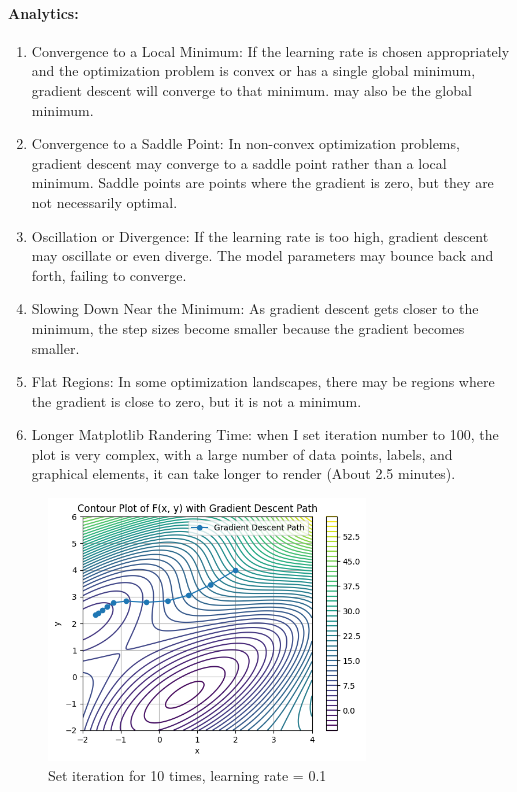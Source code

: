 \paragraph{\textbf{Analytics:}}
\begin{enumerate}
    \item Convergence to a Local Minimum: If the learning rate is chosen appropriately and the optimization problem is convex or has a single global minimum, gradient descent will converge to that minimum. may also be the global minimum.
    \item Convergence to a Saddle Point: In non-convex optimization problems, gradient descent may converge to a saddle point rather than a local minimum. Saddle points are points where the gradient is zero, but they are not necessarily optimal. 
    \item  Oscillation or Divergence: If the learning rate is too high, gradient descent may oscillate or even diverge. The model parameters may bounce back and forth, failing to converge. 
    \item Slowing Down Near the Minimum: As gradient descent gets closer to the minimum, the step sizes become smaller because the gradient becomes smaller.
    \item Flat Regions: In some optimization landscapes, there may be regions where the gradient is close to zero, but it is not a minimum. 
    \item Longer Matplotlib Randering Time: when I set iteration number to 100, the plot is very complex, with a large number of data points, labels, and graphical elements, it can take longer to render (About 2.5 minutes). 
\end{enumerate}

\begin{figure}[H]
    \centering
    \includegraphics[width=0.75\textwidth]{pic/Gradient_Descent_Step_10.png}
    \caption{Set iteration for 10 times, learning rate = 0.1}
\end{figure}
% 
% 
% 
% 
% 
% 
% 
% 
% 
% 
% 
% 